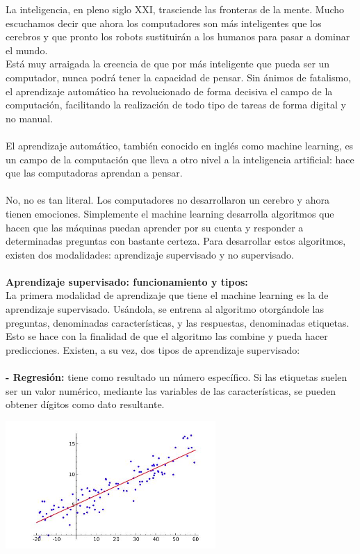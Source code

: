 \documentclass[%
 reprint,
 amsmath,amssymb,
 aps,
]{revtex4-1}
\begin{document}
La inteligencia, en pleno siglo XXI, trasciende las fronteras de la mente. Mucho escuchamos decir que ahora los computadores son más inteligentes que los cerebros y que pronto los robots sustituirán a los humanos para pasar a dominar el mundo.\\
Está muy arraigada la creencia de que por más inteligente que pueda ser un computador, nunca podrá tener la capacidad de pensar. Sin ánimos de fatalismo, el aprendizaje automático ha revolucionado de forma decisiva el campo de la computación, facilitando la realización de todo tipo de tareas de forma digital y no manual. \\
\\El aprendizaje automático, también conocido en inglés como machine learning, es un campo de la computación que lleva a otro nivel a la inteligencia artificial: hace que las computadoras aprendan a pensar.\\
\\
No, no es tan literal. Los computadores no desarrollaron un cerebro y ahora tienen emociones. Simplemente el machine learning desarrolla algoritmos que hacen que las máquinas puedan aprender por su cuenta y responder a determinadas preguntas con bastante certeza. Para desarrollar estos algoritmos, existen dos modalidades: aprendizaje supervisado y no supervisado.\\
\\
  \textbf{Aprendizaje supervisado: funcionamiento y tipos:} \\
La primera modalidad de aprendizaje que tiene el machine learning es la de aprendizaje supervisado. Usándola, se entrena al algoritmo otorgándole las preguntas, denominadas características, y las respuestas, denominadas etiquetas. Esto se hace con la finalidad de que el algoritmo las combine y pueda hacer predicciones.
Existen, a su vez, dos tipos de aprendizaje supervisado:
 \\
 \\
 \textbf{-  Regresión: }  tiene como resultado un número específico. Si las etiquetas suelen ser un valor numérico, mediante las variables de las características, se pueden obtener dígitos como dato resultante.
 \begin{center}
\includegraphics[width=8cm]{./Imagenes/regresion10}
\end{center}
\end{document}
